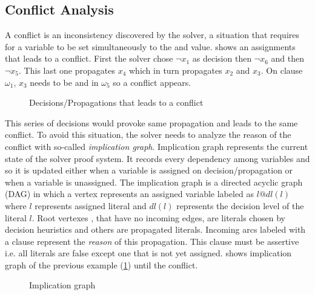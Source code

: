 \subsection{Conflict Analysis}
A conflict is an inconsistency discovered by the solver, a situation that requires for a variable to be set 
simultaneously to the \true and \false value.  shows an assignments that leads to a conflict.
First the solver chose $\neg x_1$ as decision then $\neg x_6$ and then $\neg x_5$. This last one propagates $x_4$
which in turn propagates $x_2$ and $x_3$. On clause $\omega_1$, $x_3$ needs to be \true and \false in $\omega_5$ so
a conflict appears.
\begin{figure}[!htbp]
 \centering
  
 \caption{Decisions/Propagations that leads to a  conflict}
 \label{fig:conflict}
\end{figure}
This series of decisions would provoke same propagation and leads to the same conflict. To avoid this
situation, the solver needs to analyze the reason of the conflict with so-called \emph{implication graph}.
Implication graph represents the current state of the solver proof system. It records every dependency
among variables and so it is updated either when a variable is assigned on decision/propagation or  when a variable
is unassigned. The implication graph is a directed acyclic graph (DAG) in which a vertex represents an assigned variable labeled as $l@dl(l)$ where $l$ represents assigned literal and $dl(l)$ represents the decision level of the literal $l$.
Root vertexes , that have no incoming edges, are literals chosen by decision heuristics and others are 
propagated literals.
Incoming arcs labeled with a clause represent the \emph{reason} of this propagation.
This clause must be assertive i.e. all  literals are false except one that is not yet assigned.
 shows implication graph of the previous example (\cref{fig:conflict}) until the conflict.
\begin{figure}[!htbp]
 \centering
 
 \caption{Implication graph}
 \label{fig:implication-graph}
\end{figure}


